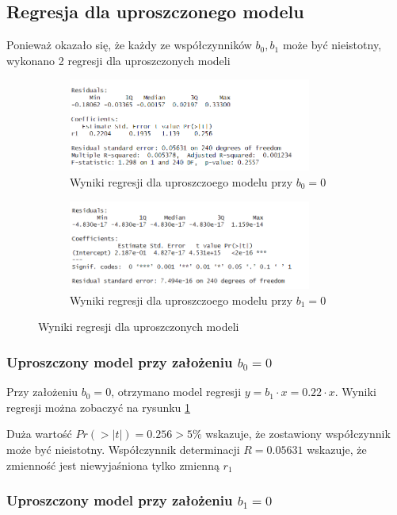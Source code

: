 \documentclass[a4paper,11pt]{article}
\begin{document}
\subsection{Regresja dla uproszczonego modelu}
Ponieważ okazało się, że każdy ze współczynników $b_{0}, b_{1}$ może być nieistotny, wykonano 2 regresji dla uproszczonych modeli

\begin{figure}
  \begin{subfigure}{0.5\textwidth}
    \includegraphics[width=8cm]{images/regresja_upr1.png}
    \caption{Wyniki regresji dla uproszczoego modelu przy $b_{0}=0$}
    \label{fig:regresja_upr1}
  \end{subfigure}%
  \begin{subfigure}{0.5\textwidth}
    \includegraphics[width=8cm]{images/regresja_upr2.png}
    \caption{Wyniki regresji dla uproszczoego modelu przy $b_{1}=0$}
    \label{fig:regresja_upr2}
  \end{subfigure}
  \caption{Wyniki regresji dla uproszczonych modeli}
\end{figure}


\subsubsection{Uproszczony model przy założeniu $b_{0}=0$}

Przy założeniu $b_{0}=0$, otrzymano model regresji $y=b_{1}\cdot x = 0.22\cdot x$. Wyniki regresji można zobaczyć na rysunku \ref{fig:regresja_upr1}

Duża wartość $Pr(>|t|) = 0.256 > 5\%$ wskazuje, że zostawiony współczynnik może być nieistotny. Współczynnik determinacji $R=0.05631$ wskazuje, że zmienność jest niewyjaśniona tylko zmienną $r_{1}$

\subsubsection{Uproszczony model przy założeniu $b_{1}=0$}
\end{document}
